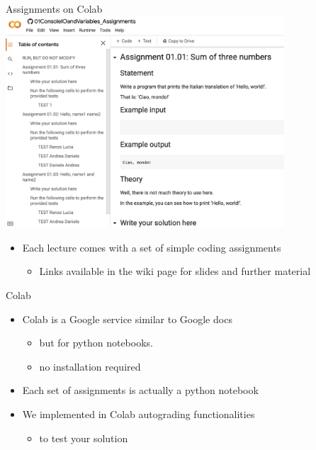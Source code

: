 \documentclass{beamer}%
\begin{document}
\begin{frame}{Assignments on Colab}
	\centering 
	\includegraphics[width=0.78\textwidth]{figures/colab1}
	\begin{itemize}
		\item Each lecture comes with a set of simple coding assignments
		\begin{itemize}
			\item Links available in the wiki page for slides and further material
		\end{itemize}
	\end{itemize}
\end{frame}

\begin{frame}{Colab}
	\centering 
	\begin{itemize}
		\item Colab is a Google service similar to Google docs 
		\begin{itemize}
			\item but for python notebooks.
			\item no installation required
		\end{itemize}	
		\item Each set of assignments is actually a python notebook
		\item We implemented in Colab autograding functionalities
		\begin{itemize}
			\item to test your solution
		\end{itemize}	
	\end{itemize}
\end{frame}
\end{document}
